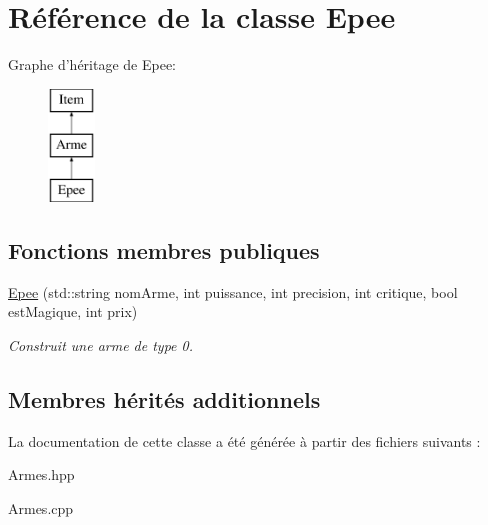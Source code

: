 \hypertarget{classEpee}{\section{Référence de la classe Epee}
\label{classEpee}
}
Graphe d'héritage de Epee\-:\begin{figure}[H]
\begin{center}
\leavevmode
\includegraphics[height=3.000000cm]{classEpee}
\end{center}
\end{figure}
\subsection*{Fonctions membres publiques}
\begin{DoxyCompactItemize}
\item 
\hypertarget{classEpee_a4553a29d6b18c191d6fcf44575a516ae}{\hyperlink{classEpee_a4553a29d6b18c191d6fcf44575a516ae}{Epee} (std\-::string nom\-Arme, int puissance, int precision, int critique, bool est\-Magique, int prix)}\label{classEpee_a4553a29d6b18c191d6fcf44575a516ae}

\begin{DoxyCompactList}\small\item\em Construit une arme de type 0. \end{DoxyCompactList}\end{DoxyCompactItemize}
\subsection*{Membres hérités additionnels}


La documentation de cette classe a été générée à partir des fichiers suivants \-:\begin{DoxyCompactItemize}
\item 
Armes.\-hpp\item 
Armes.\-cpp\end{DoxyCompactItemize}
